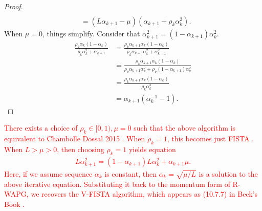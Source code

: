 \documentclass[12pt]{article}
\begin{document}
\begin{proof}
\begin{align*}
            \\
            &= (L \alpha_{k + 1} - \mu)(\alpha_{k + 1} + \rho_k \alpha_k^2). 
        \end{align*}
        When $\mu = 0$, things simplify. 
        Consider that $\alpha_{k +1}^2 = (1 - \alpha_{k + 1})\alpha_k^2$. 
        \begin{align*}
            \frac{\rho_k\alpha_k(1 - \alpha_k)}{\rho_k\alpha_k^2 + \alpha_{k + 1}}
            &= 
            \frac{\rho_k\alpha_{k + 1}\alpha_k(1 - \alpha_k)}
            {\rho_k\alpha_{k + 1}\alpha_k^2 + \alpha_{k + 1}^2}
            \\
            &= 
            \frac{\rho_k\alpha_{k + 1}\alpha_k(1 - \alpha_k)}
            {\rho_k\alpha_{k + 1}\alpha_k^2 + \rho_k(1 - \alpha_{k + 1})\alpha_k^2}
            \\
            &= \frac{\rho_k\alpha_{k + 1}\alpha_k(1 - \alpha_k)}{\rho_k\alpha_k^2}
            \\
            &= \alpha_{k + 1}(\alpha_k^{-1} - 1). 
        \end{align*}
    \end{proof}
    \begin{remark}
        \textcolor{red}
        {
        There exists a choice of $\rho_k \in [0, 1), \mu = 0$ such that the above algorithm is equivalent to Chambolle Dossal 2015 \cite{chambolle_convergence_2015}. 
        When $\rho_k = 1$, this becomes just FISTA \cite{beck_fast_2009}. 
        When $L > \mu > 0$, then choosing $\rho_k = 1$ yields equation 
        \begin{align*}
            L \alpha_{k + 1}^2 = (1- \alpha_{k + 1})L \alpha_k^2 + \alpha_{k + 1} \mu. 
        \end{align*}
        Here, if we assume sequence $\alpha_k$ is constant, then $\alpha_k = \sqrt{\mu/L}$ is a solution to the above iterative equation. 
        Substituting it back to the momentum form of R-WAPG, we recovers the V-FISTA algorithm, which appears as (10.7.7) in Beck's Book \cite{beck_first-order_2017}. 
        }
    \end{remark}
    


\end{document}
